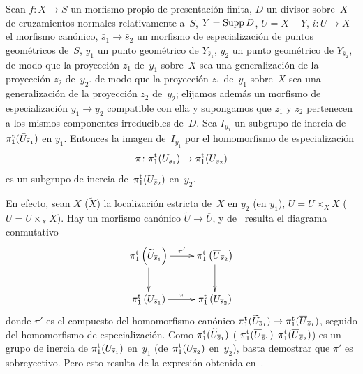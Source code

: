 
\begingroup
\shorthandoff{<>}%
\setcounter{proposition}{10}%
\begin{lemme}
\label{XIII.2.11}
Sean $f\colon X\to S$ un morfismo propio de presentación finita,
$D$ un divisor sobre~$X$ de cruzamientos normales relativamente a~$S$,
$Y=\operatorname{Supp} D$, $U=X-Y$, $i\colon U\to X$ el morfismo canónico,
$\bar{s}_1\to\bar{s}_2$ un morfismo de especialización de puntos
geométricos de~$S$, $y_1$ un punto geométrico de
$Y_{\bar{s}_1}$, $y_2$ un punto geométrico de
$Y_{\bar{s}_2}$,
{de modo que la proyección $z_1$ de~$y_1$ sobre~$X$ sea una
generalización de la proyección $z_2$ de~$y_2$.}
{de modo que la proyección $z_1$ de~$y_1$ sobre~$X$ sea una
generalización de la proyección $z_2$ de~$y_2$; elijamos además un
morfismo de especialización $y_1\to y_2$ compatible con ella y
supongamos que $z_1$ y $z_2$ pertenecen a los mismos componentes
irreducibles de~$D$.}
Sea $I_{y_1}$
un subgrupo de inercia de~$\pi_1^{\mathrm{t}}(\bar{U}_{\bar{s}_1})$ en
$y_1$. Entonces la imagen de~$I_{y_{1}}$ por el homomorfismo de
especialización
$$
\pi\colon \pi_1^{\mathrm{t}}(U_{\bar{s}_1})\to
\pi_1^{\mathrm{t}}(U_{\bar{s}_2})
$$
es
un subgrupo de inercia de~$\pi_1^{\mathrm{t}}(U_{\overline{s}_2})$
en~$y_2$.
\end{lemme}

En efecto, sean $\overline{X}$ (\resp $\widetilde{X}$) la localización
estricta de~$X$ en $y_2$ (\resp en $y_1$),
$\overline{U}=U \times_X \overline{X}$
(\resp $\widetilde{U}=U\times_X \widetilde{X}$). Hay un morfismo
canónico $\widetilde{U}\to \overline{U}$, y de~
{}
{}
resulta el diagrama conmutativo
$$
\xymatrix{ \pi_1^{\tame} \left(\widetilde{U}_{\overline{s}_1} \right)
\ar[r]^{\pi '} \ar[d] & \pi_1^{\tame} \left(
\overline{U}_{\overline{s}_2} \right) \ar[d] \\ \pi_1^{\tame} \left(
U_{\overline{s}_1} \right) \ar[r]^{\pi } & \pi_1^{\tame} \left(
U_{\overline{s}_2} \right) }
$$
donde $\pi'$ es el compuesto del homomorfismo canónico
$\pi_1^{\mathrm{t}}(\widetilde{U}_ {\overline{s}_1})\to
\pi_1^{\mathrm{t}}(\overline{U}_{\overline{s}_1})$, seguido del homomorfismo de
especialización. Como
$\pi_1^{\mathrm{t}}(\widetilde{U}_{\overline{s}_1})$
(\resp
{}
{$\pi_1^{\mathrm{t}}(\overline{U}_{\overline{s}_1})$}
{$\pi_1^{\mathrm{t}}(\overline{U}_{\overline{s}_2})$})
es un grupo de inercia de
$\pi_1^{\mathrm{t}}(U_{\overline{s}_1})$ en~$y_1$
(\resp de~$\pi_1^{\mathrm{t}}(U_{\overline{s}_2})$ en~$y_2$), basta
demostrar que $\pi'$ es sobreyectivo. Pero esto resulta de la expresión
obtenida en~.

\endgroup

